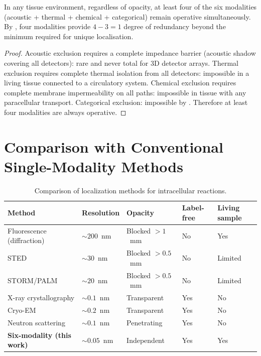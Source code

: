 \begin{corollary}
\label{cor:guaranteed-loc}
In any tissue environment, regardless of opacity, at least four of the six
modalities (acoustic + thermal + chemical + categorical) remain operative
simultaneously.  By , four modalities provide
$4 - 3 = 1$ degree of redundancy beyond the minimum required for unique
localisation.
\end{corollary}

\begin{proof}
Acoustic exclusion requires a complete impedance barrier (acoustic shadow
covering all detectors): rare and never total for 3D detector arrays.
Thermal exclusion requires complete thermal isolation from all detectors:
impossible in a living tissue connected to a circulatory system.  Chemical
exclusion requires complete membrane impermeability on all paths: impossible
in tissue with any paracellular transport.  Categorical exclusion: impossible
by .  Therefore at least four modalities are always
operative.
\end{proof}

\section{Comparison with Conventional Single-Modality Methods}
\label{sec:comparison}

\begin{table}[!htbp]
\centering
\caption{Comparison of localization methods for intracellular reactions.}
\label{tab:comparison}
\begin{tabular}{lllll}
\toprule
Method & Resolution & Opacity & Label-free & Living sample \\
\midrule
Fluorescence (diffraction) & $\sim 200$~nm & Blocked $> 1$~mm & No & Yes \\
STED                        & $\sim 30$~nm  & Blocked $> 0.5$~mm & No & Limited \\
STORM/PALM                  & $\sim 20$~nm  & Blocked $> 0.5$~mm & No & Limited \\
X-ray crystallography       & $\sim 0.1$~nm & Transparent & Yes & No \\
Cryo-EM                     & $\sim 0.2$~nm & Transparent & Yes & No \\
Neutron scattering          & $\sim 0.1$~nm & Penetrating & Yes & No \\
\midrule
\textbf{Six-modality (this work)} & $\sim 0.05$~nm & Independent & Yes & Yes \\
\bottomrule
\end{tabular}
\end{table}

